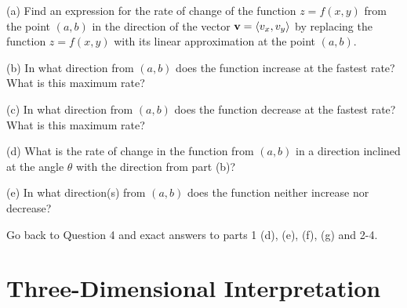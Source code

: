\documentclass{ximera}
\begin{document}
\begin{question}  \label{Qedf4t5t}
(a) Find an expression for the rate of change of the function $z=f(x,y)$ from the point $(a,b)$ in the direction of the vector ${\bf v} = \langle v_x, v_y \rangle$ by replacing the function $z=f(x,y)$ with its linear approximation at the point $(a,b)$.

(b) In what direction from $(a,b)$ does the function increase at the fastest rate? What is this maximum rate?

(c) In what direction from $(a,b)$ does the function decrease at the fastest rate? What is this maximum rate?

(d) What is the rate of change in the function from $(a,b)$ in a direction inclined at the angle $\theta$ with the direction from part (b)?

(e)  In what direction(s) from $(a,b)$ does the function neither increase nor decrease?

\end{question}

\begin{question}  \label{Qdef67kk}
Go back to Question 4 and exact answers to parts 1 (d), (e), (f), (g) and 2-4.

\end{question}






\section{Three-Dimensional Interpretation}
\end{document}
